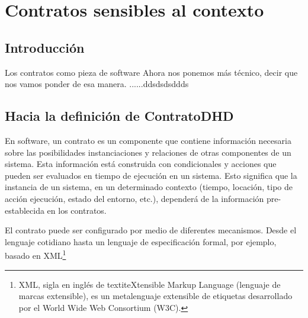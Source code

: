 
\chapter{Contratos sensibles al contexto}\label{cap:contratos} \label{cap:5}



\section {Introducción}\label{sec:Introducción}

Los contratos como pieza de software 
Ahora nos ponemos más técnico, decir que nos vamos ponder de esa manera.
......ddsdsdsddds


\section {Hacia la definición de ContratoDHD}\label{sec:Hacia}

En software, un contrato es un componente que contiene información necesaria sobre las posibilidades instanciaciones y relaciones de otras componentes de un sistema. Esta información está construida con condicionales y acciones que pueden ser evaluados en tiempo de ejecución en un sistema. Esto significa que la instancia de un sistema, en un determinado contexto (tiempo, locación, tipo de acción ejecución, estado del entorno, etc.), dependerá de la información pre-establecida en los contratos. 


El contrato puede ser configurado por medio de diferentes mecanismos. Desde el lenguaje cotidiano hasta un lenguaje de especificación formal, por ejemplo, basado en XML\footnote {XML, sigla en inglés de textit{eXtensible Markup Language} (lenguaje de marcas extensible), es un metalenguaje extensible de etiquetas desarrollado por el World Wide Web Consortium (W3C).} 



